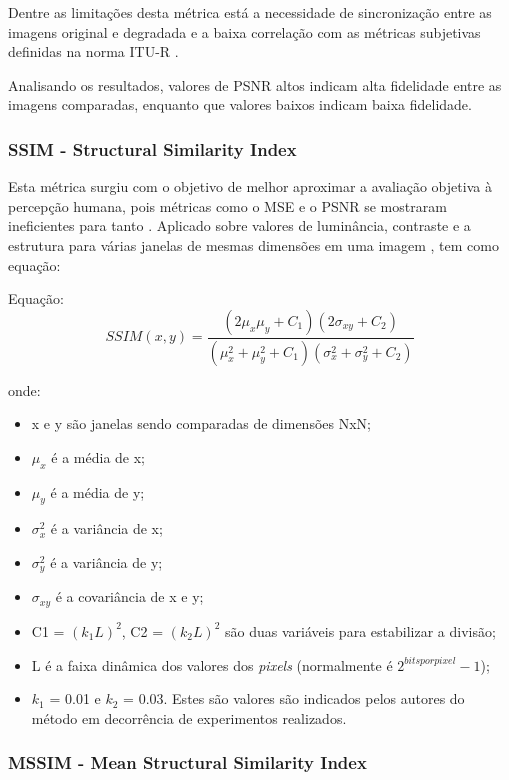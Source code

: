 Dentre as limitações desta métrica está a necessidade de sincronização entre as imagens original e degradada e a baixa correlação com as métricas subjetivas definidas na norma ITU-R \cite{emmersonsilva, itubt500}.

Analisando os resultados, valores de PSNR altos indicam alta fidelidade entre as imagens comparadas, enquanto que valores baixos indicam baixa fidelidade.

\subsubsection[SSIM]{SSIM - Structural Similarity Index}

Esta métrica surgiu com o objetivo de melhor aproximar a avaliação objetiva à percepção humana, pois métricas como o MSE e o PSNR se mostraram ineficientes para tanto \cite{emmersonsilva}. Aplicado sobre valores de luminância, contraste e a estrutura para várias janelas de mesmas dimensões em uma imagem \cite{wangbovik2004}, tem como equação:

    Equação: \[SSIM(x, y) = \frac{(2\mu_{x}\mu_{y} + C_{1})(2\sigma_{xy} + C_{2})} {(\mu_{x}^{2} + \mu_{y}^{2}+C_{1})(\sigma_{x}^{2} + \sigma_{y}^{2}+C_{2})}\]

onde:
\begin{itemize}
	\item x e y são janelas sendo comparadas de dimensões NxN;
	\item \(\mu_{x}\) é a média de x;
    \item \(\mu_{y}\) é  a média de y;
    \item \(\sigma^{2}_{x}\) é a variância de x;
    \item \(\sigma^{2}_{y}\) é a variância de y;
    \item \(\sigma_{xy}\) é a covariância de x e y;
    \item C1 = \((k_{1}L)^{2}\), C2 = \((k_{2}L)^{2}\) são duas variáveis para estabilizar a divisão;
    \item L é a faixa dinâmica dos valores dos \emph{pixels} (normalmente é \(2^{bits por pixel} - 1\));
    \item \(k_{1}\) = 0.01 e \(k_{2}\) = 0.03. Estes são valores são indicados pelos autores do método \cite{wangbovik2004} em decorrência de experimentos realizados.
\end{itemize}

\subsubsection[MSSIM]{MSSIM - Mean Structural Similarity Index}

